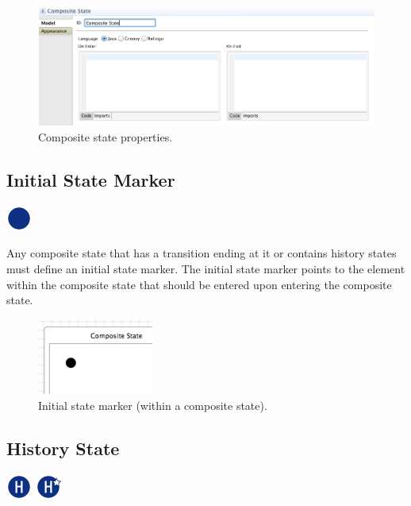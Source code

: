 \documentclass[11pt]{amsart}
\begin{document}
\begin{figure}
\begin{center}
\vspace{.2in}
\centerline {
\includegraphics[width=5in]{StatechartsImages/CompositeStateProperties.png}
}
\caption{Composite state properties.}
\label{fig:compositeStateProperties}
\end{center}
\end{figure}

\clearpage

\subsection{Initial State Marker}
\label{sec:initialStateMarker}
\includegraphics[height=.2in]{StatechartsImages/Initial-State-32.png}

Any composite state that has a transition ending at it or contains history states must define an initial state marker. The initial state marker points to the element within the composite state that should be entered upon entering the composite state.

\begin{figure}
\begin{center}
\vspace{.2in}
\centerline {
\includegraphics[width=1.5in]{StatechartsImages/InitialStateMarker.png}
}
\caption{Initial state marker (within a composite state).}
\label{fig:initialStateMarker}
\end{center}
\end{figure}


\subsection{History State}
\label{sec:historyState}
\includegraphics[height=.2in]{StatechartsImages/Shallow-History-32.png} \includegraphics[height=.2in]{StatechartsImages/Deep-History-32.png}
\end{document}
